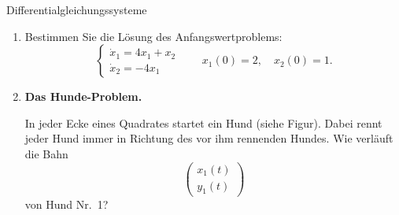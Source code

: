 \clearpage

\begin{ueb}{Differentialgleichungssysteme}{}

    \begin{enumerate}
        \item Bestimmen Sie die Lösung des Anfangswertproblems:
              \[
                  \begin{cases}
                      \dot{x}_1 = 4x_1+x_2 \\
                      \dot{x}_2 = -4x_1
                  \end{cases}
                  \qquad
                  x_1(0)=2,\quad x_2(0)=1.
              \]

        \item \textbf{Das Hunde-Problem.}

              In jeder Ecke eines Quadrates startet ein Hund (siehe Figur).
              Dabei rennt jeder Hund immer in Richtung des vor ihm
              rennenden Hundes. Wie verläuft die Bahn
              \[
                  \begin{pmatrix}
                      x_1(t) \\y_1(t)
                  \end{pmatrix}
              \]
              von Hund Nr.~1?


              \begin{center}
\end{center}
\end{enumerate}
\end{ueb}
